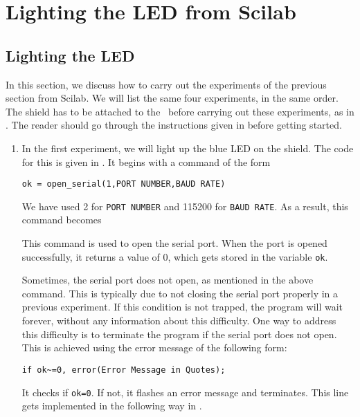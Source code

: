 \section{Lighting the LED from Scilab}
\subsection{Lighting the LED}
\label{sec:light-sci}
In this section, we discuss how to carry out the experiments of the
previous section from Scilab.  We will list the same four experiments,
in the same order.  The shield has to be attached to the \arduino\
before carrying out these experiments, as in .
The reader should go through the instructions given in
 before getting started.
\begin{enumerate}
  \item In the first experiment, we will light up the blue LED on the
        shield.  The code for this is given in \sciref{sci:led-blue}.  It
        begins with a command of the form
        \begin{lstlisting}[style=nonumbers]
     ok = open_serial(1,PORT NUMBER,BAUD RATE)
  \end{lstlisting}
        We have used 2 for {\tt PORT NUMBER} and 115200 for {\tt BAUD RATE}.
        As a result, this command becomes
        
        This command is used to open the serial port.  When the port is
        opened successfully, it returns a value of 0, which gets stored in
        the variable {\tt ok}.
        
        Sometimes, the serial port does not open, as mentioned in the above
        command.  This is typically due to not closing the serial port
        properly in a previous experiment.  If this condition is not
        trapped, the program will wait forever, without any information
        about this difficulty.  One way to address this difficulty is to
        terminate the program if the serial port does not open.  This is
        achieved using the error message of the following form:
        \begin{lstlisting}[style=nonumbers]
     if ok~=0, error(Error Message in Quotes);
  \end{lstlisting}
        It checks if {\tt ok=0}.  If not, it flashes an error message and
        terminates.  This line gets implemented in the following way in
        \sciref{sci:led-blue}.  
        
        

\end{enumerate}
